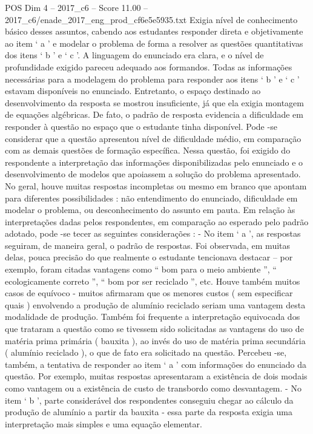 \begin{textsample}{POS Dim 4 – 2017\_c6 – Score 11.00 – 2017\_c6/enade\_2017\_eng\_prod\_cf6e5e5935.txt}
Exigia nível de conhecimento básico desses assuntos, cabendo aos estudantes responder direta e objetivamente ao item ‘ a ’ e modelar o problema de forma a resolver as questões quantitativas dos itens ‘ b ’ e ‘ c ’.
A linguagem do enunciado era clara, e o nível de profundidade exigido pareceu adequado aos formandos.
Todas as informações necessárias para a modelagem do problema para responder aos itens ‘ b ’ e ‘ c ’ estavam disponíveis no enunciado.
Entretanto, o espaço destinado ao desenvolvimento da resposta se mostrou insuficiente, já que ela exigia montagem de equações algébricas.
De fato, o padrão de resposta evidencia a dificuldade em responder à questão no espaço que o estudante tinha disponível.
Pode -se considerar que a questão apresentou nível de dificuldade médio, em comparação com as demais questões de formação específica.
Nessa questão, foi exigido do respondente a interpretação das informações disponibilizadas pelo enunciado e o desenvolvimento de modelos que apoiassem a solução do problema apresentado.
No geral, houve muitas respostas incompletas ou mesmo em branco que apontam para diferentes possibilidades : não entendimento do enunciado, dificuldade em modelar o problema, ou desconhecimento do assunto em pauta.
Em relação às interpretações dadas pelos respondentes, em comparação ao esperado pelo padrão adotado, pode -se tecer as seguintes considerações : - No item ‘ a ’, as respostas seguiram, de maneira geral, o padrão de respostas.
Foi observada, em muitas delas, pouca precisão do que realmente o estudante tencionava destacar – por exemplo, foram citadas vantagens como “ bom para o meio ambiente ”, “ ecologicamente correto ”, “ bom por ser reciclado ”, etc.
Houve também muitos casos de equívoco - muitos afirmaram que os menores custos ( sem especificar quais ) envolvendo a produção de alumínio reciclado seriam uma vantagem desta modalidade de produção.
Também foi frequente a interpretação equivocada dos que trataram a questão como se tivessem sido solicitadas as vantagens do uso de matéria prima primária ( bauxita ), ao invés do uso de matéria prima secundária ( alumínio reciclado ), o que de fato era solicitado na questão.
Percebeu -se, também, a tentativa de responder ao item ‘ a ’ com informações do enunciado da questão.
Por exemplo, muitas respostas apresentaram a existência de dois modais como vantagem ou a existência de custo de transbordo como desvantagem. - No item ‘ b ’, parte considerável dos respondentes conseguiu chegar ao cálculo da produção de alumínio a partir da bauxita - essa parte da resposta exigia uma interpretação mais simples e uma equação elementar.

\end{textsample}
